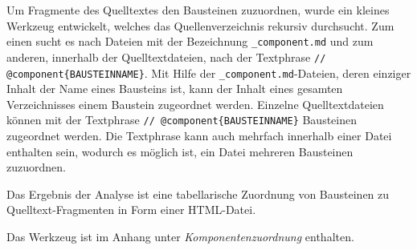 Um Fragmente des Quelltextes den Bausteinen zuzuordnen, wurde ein kleines Werkzeug entwickelt, welches das Quellenverzeichnis rekursiv durchsucht. Zum einen sucht es nach Dateien mit der Bezeichnung \glqq\lstinline|_component.md|\grqq{} und zum anderen, innerhalb der Quelltextdateien, nach der Textphrase \glqq\lstinline|// @component{BAUSTEINNAME}|\grqq{}. 
Mit Hilfe der \lstinline|_component.md|-Dateien, deren einziger Inhalt der Name eines Bausteins ist, kann der Inhalt eines gesamten Verzeichnisses einem Baustein zugeordnet werden. Einzelne Quelltextdateien können mit der Textphrase \glqq\lstinline|// @component{BAUSTEINNAME}|\grqq{} Bausteinen zugeordnet werden. Die Textphrase kann auch mehrfach innerhalb einer Datei enthalten sein, wodurch es möglich ist, ein Datei mehreren Bausteinen zuzuordnen. 

Das Ergebnis der Analyse ist eine tabellarische Zuordnung von Bausteinen zu Quelltext-Fragmenten in Form einer HTML-Datei. 

Das Werkzeug ist im Anhang unter \emph{Komponentenzuordnung} enthalten.